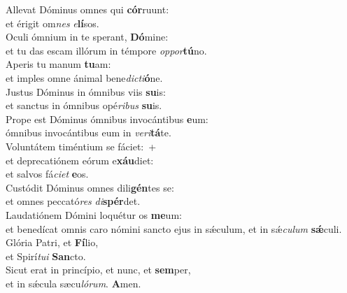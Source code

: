 \evenverse Allevat Dóminus omnes qui \textbf{cór}ruunt:~\*\\
\evenverse et érigit om\textit{nes} \textit{e}\textbf{lí}sos.\\
\oddverse Oculi ómnium in te sperant, \textbf{Dó}mine:~\*\\
\oddverse et tu das escam illórum in témpore \textit{op}\textit{por}\textbf{tú}no.\\
\evenverse Aperis tu manum \textbf{tu}am:~\*\\
\evenverse et imples omne ánimal bene\textit{di}\textit{cti}\textbf{ó}ne.\\
\oddverse Justus Dóminus in ómnibus viis \textbf{su}is:~\*\\
\oddverse et sanctus in ómnibus opé\textit{ri}\textit{bus} \textbf{su}is.\\
\evenverse Prope est Dóminus ómnibus invocántibus \textbf{e}um:~\*\\
\evenverse ómnibus invocántibus eum in \textit{ve}\textit{ri}\textbf{tá}te.\\
\oddverse Voluntátem timéntium se fáciet:~+\\
\oddverse  et deprecatiónem eórum e\textbf{xáu}diet:~\*\\
\oddverse et salvos fá\textit{ci}\textit{et} \textbf{e}os.\\
\evenverse Custódit Dóminus omnes dili\textbf{gén}tes se:~\*\\
\evenverse et omnes peccató\textit{res} \textit{di}\textbf{spér}det.\\
\oddverse Laudatiónem Dómini loquétur os \textbf{me}um:~\*\\
\oddverse et benedícat omnis caro nómini sancto ejus in sǽculum, et in sǽ\textit{cu}\textit{lum} \textbf{sǽ}culi.\\
\evenverse Glória Patri, et \textbf{Fí}lio,~\*\\
\evenverse et Spirí\textit{tu}\textit{i} \textbf{San}cto.\\
\oddverse Sicut erat in princípio, et nunc, et \textbf{sem}per,~\*\\
\oddverse et in sǽcula sæcu\textit{ló}\textit{rum}. \textbf{A}men.\\
